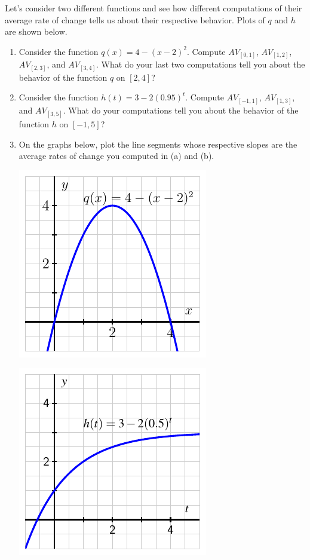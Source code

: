 \documentclass[nooutcomes]{ximera}
\begin{document}
\begin{exploration}
Let's consider two different functions and see how different computations of their average rate of change tells us about their respective behavior. Plots of $q$  and $h$ are shown below.

\begin{enumerate}[label=\alph*.]
\item Consider the function $q(x) = 4-(x-2)^2$. Compute $AV_{[0,1]}$, $AV_{[1,2]}$, $AV_{[2,3]}$, and $AV_{[3,4]}$. What do your last two computations tell you about the behavior of the function $q$ on $[2,4]$?


\item Consider the function $h(t) = 3 - 2(0.95)^t$. Compute $AV_{[-1,1]}$, $AV_{[1,3]}$, and $AV_{[3,5]}$. What do your computations tell you about the behavior of the function $h$ on $[-1,5]$?

\item On the graphs below, plot the line segments whose respective slopes are the average rates of change you computed in (a) and (b).

\begin{image}
\includegraphics{aroc-act-trends-q.pdf}
\end{image}

\begin{image}
\includegraphics{aroc-act-trends-h.pdf}
\end{image}


\end{enumerate}
\end{exploration}
\end{document}
